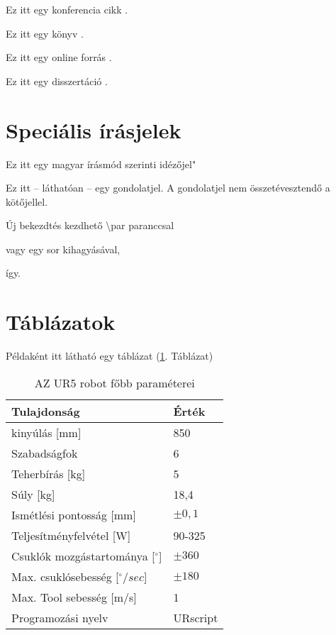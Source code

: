 \documentclass[12pt,a4paper]{article}
\begin{document}
	Ez itt egy konferencia cikk \cite{conference-example}.
	
	Ez itt egy könyv \cite{book-example}.
	
	Ez itt egy online forrás \cite{online-example}.
	
	Ez itt egy disszertáció \cite{thesis-example}.
	
	\section{Speciális írásjelek}
	Ez itt egy magyar írásmód szerinti \leftq{}idézőjel"
	
	Ez itt -- láthatóan -- egy gondolatjel. A gondolatjel nem összetévesztendő a kötőjellel.
	
	Új bekezdtés kezdhető \textbackslash par paranccsal \par
	vagy egy sor kihagyásával, 
	
	így.
	
	\section{Táblázatok}
	Példaként itt látható egy táblázat (\ref{tab:ur5}. Táblázat)
	
	\begin{table}[H]
		\centering
		\caption{AZ UR5 robot főbb paraméterei}
		\label{tab:ur5}
		\begin{tabular}{l|l}
			Tulajdonság                      & Érték    \\ \hline
			kinyúlás {[}mm{]}                & 850      \\ \hline
			Szabadságfok                     & 6        \\ \hline
			Teherbírás {[}kg{]}               & 5        \\ \hline
			Súly {[}kg{]}                    & 18,4     \\ \hline
			Ismétlési pontosság {[}mm{]}     & $\pm0,1$    \\ \hline
			Teljesítményfelvétel {[}W{]}     & 90-325   \\ \hline
			Csuklók mozgástartománya {[}$^{\circ}${]} & $\pm360$    \\ \hline
			Max. csuklósebesség {[}$^{\circ}/sec${]}  & $\pm180$    \\ \hline
			Max. Tool sebesség {[}m/s{]}     & 1        \\ \hline
			Programozási nyelv               & URscript \\ \hline
		\end{tabular}
	\end{table}
\end{document}
